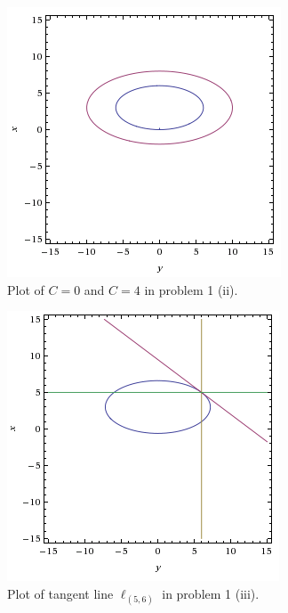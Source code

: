 \documentclass[a4paper,norsk,12pt]{article}
\begin{document}
\begin{figure}[h]
  \centering
  \includegraphics{ob1plot2.png}
  \caption{Plot of $C=0$ and $C=4$ in problem 1 (ii).}
  \label{plot.p2}
\end{figure}

\begin{figure}[h]
  \centering
  \includegraphics{ob1plot3.png}
  \caption{Plot of tangent line $\ell_{(5,6)}$ in problem 1 (iii).}
  \label{plot.p3}
\end{figure}
\end{document}

